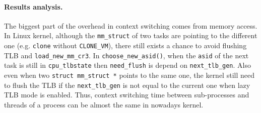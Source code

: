 \paragraph{Results analysis.} The biggest part of the overhead in context switching comes from memory access. In Linux kernel, although the \texttt{mm\_struct} of two tasks are pointing to the different one (e.g. \texttt{clone} without \texttt{CLONE\_VM}), there still exists a chance to avoid flushing TLB and \texttt{load\_new\_mm\_cr3}. In \texttt{choose\_new\_asid()}, when the \texttt{asid} of the next task is still in \texttt{cpu\_tlbstate} then \texttt{need\_flush} is depend on \texttt{next\_tlb\_gen}. Also even when two \texttt{struct mm\_struct *} points to the same one, the kernel still need to flush the TLB if the \texttt{next\_tlb\_gen} is not equal to the current one when lazy TLB mode is enabled. Thus, context switching time between sub-processes and threads of a process can be almost the same in nowadays kernel.
